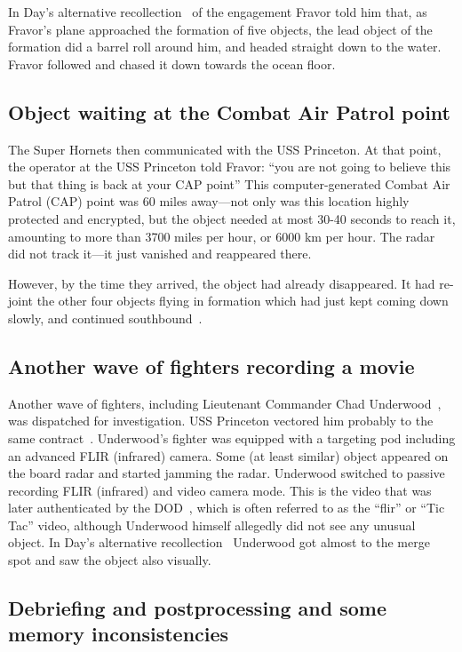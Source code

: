 In Day's alternative recollection~\cite{WestDayKevin2021Feb} of the engagement Fravor told him that, as Fravor's plane
approached the formation of five objects, the lead object of the formation did  a barrel roll around him,
and headed straight down to the water. Fravor followed and chased it down towards the ocean floor.

\subsection{Object waiting at the Combat Air Patrol point}

The Super Hornets then communicated with the USS Princeton.
At that point, the operator at the USS Princeton told Fravor: ``you are not going to believe this but that thing is back at your CAP point''
This computer-generated Combat Air Patrol (CAP) point was 60 miles away---not only was
this  location highly protected and encrypted, but the object needed at most 30-40 seconds to reach it, amounting to more than
3700 miles per hour, or 6000 km per hour.
The radar did not track it---it just vanished and reappeared there.

However, by the time they arrived, the object had already disappeared.
It had re-joint the other four objects flying in formation which had just kept coming down slowly,
and continued southbound~\cite{WestDayKevin2021Feb}.

\subsection{Another wave of fighters recording a movie}

Another wave of fighters, including Lieutenant Commander Chad Underwood~\cite{Phelan2019Dec},
was dispatched for investigation.
USS Princeton vectored him  probably to the same contract~\cite{WestDayKevin2021Feb}.
Underwood's fighter was equipped with a targeting pod including an advanced FLIR (infrared) camera.
Some (at least similar) object appeared on the board radar and started jamming the radar.
Underwood switched to passive recording FLIR (infrared) and video
camera mode.
This is the video that was later authenticated by the DOD~\cite{DOD2020},
which is often referred to as the ``flir'' or ``Tic Tac'' video, although Underwood himself allegedly did not see any unusual object.
In Day's alternative recollection~\cite{WestDayKevin2021Feb} Underwood got almost to the merge spot
and saw the object also visually.

\subsection{Debriefing and postprocessing and some memory inconsistencies}


